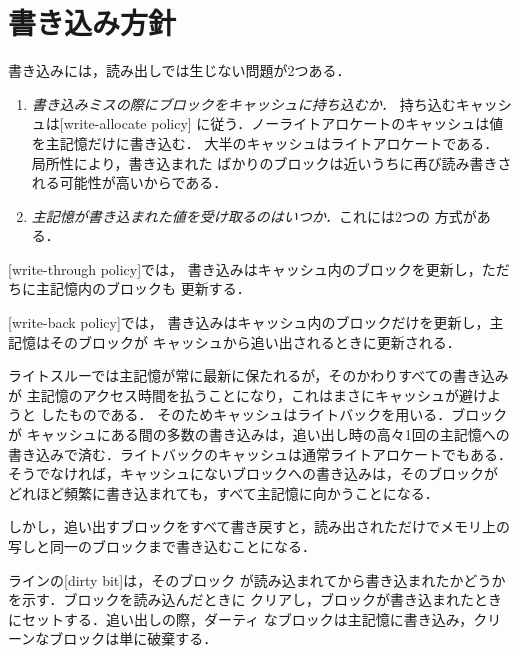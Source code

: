 \documentclass[../main.tex]{subfiles}
\begin{document}
\section{書き込み方針}
\label{sec:l12-write}

書き込みには，読み出しでは生じない問題が2つある．

\begin{enumerate}
  \item \emph{書き込みミスの際にブロックをキャッシュに持ち込むか．}
    持ち込むキャッシュは[write-allocate policy]%
    に従う．ノーライトアロケートのキャッシュは値を主記憶だけに書き込む．
    大半のキャッシュはライトアロケートである．局所性により，書き込まれた
    ばかりのブロックは近いうちに再び読み書きされる可能性が高いからである．
  \item \emph{主記憶が書き込まれた値を受け取るのはいつか．}これには2つの
    方式がある．
\end{enumerate}

\begin{definition}[ライトスルーとライトバック]
  [write-through policy]では，
  書き込みはキャッシュ内のブロックを更新し，ただちに主記憶内のブロックも
  更新する．

  [write-back policy]では，
  書き込みはキャッシュ内のブロックだけを更新し，主記憶はそのブロックが
  キャッシュから追い出されるときに更新される．
\end{definition}

ライトスルーでは主記憶が常に最新に保たれるが，そのかわりすべての書き込みが
主記憶のアクセス時間を払うことになり，これはまさにキャッシュが避けようと
したものである．%
そのためキャッシュはライトバックを用いる．ブロックが
キャッシュにある間の多数の書き込みは，追い出し時の高々1回の主記憶への
書き込みで済む．ライトバックのキャッシュは通常ライトアロケートでもある．
そうでなければ，キャッシュにないブロックへの書き込みは，そのブロックが
どれほど頻繁に書き込まれても，すべて主記憶に向かうことになる．

しかし，追い出すブロックをすべて書き戻すと，読み出されただけでメモリ上の
写しと同一のブロックまで書き込むことになる．

\begin{definition}[ダーティビット]
  ラインの[dirty bit]は，そのブロック
  が読み込まれてから書き込まれたかどうかを示す．ブロックを読み込んだときに
  クリアし，ブロックが書き込まれたときにセットする．追い出しの際，ダーティ
  なブロックは主記憶に書き込み，クリーンなブロックは単に破棄する．
\end{definition}
\end{document}
